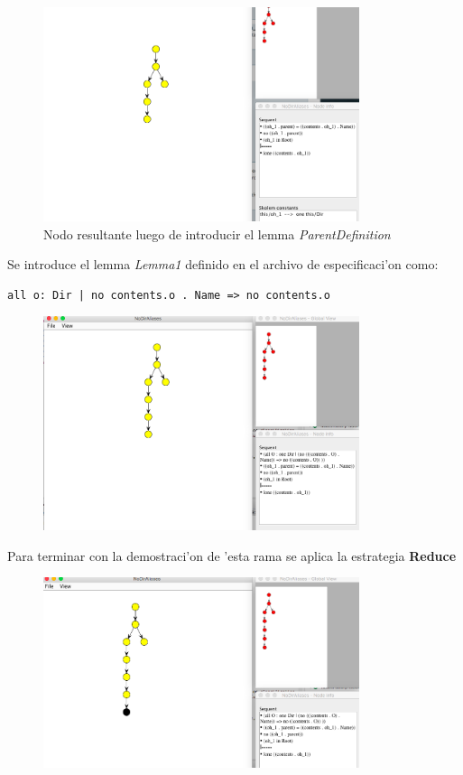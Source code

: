 \begin{figure}[H]
	\includegraphics[width=350px]{img/ejemplo/12.png}
	\centering
	\caption{Nodo resultante luego de introducir el lemma \textit{ParentDefinition}}
\end{figure}

Se introduce el lemma \textit{Lemma1} definido en el archivo de especificaci'on como:

\begin{verbatim}
all o: Dir | no contents.o . Name => no contents.o
\end{verbatim}

\begin{figure}[H]
	\includegraphics[width=350px]{img/ejemplo/13.png}
	\centering
	\caption{}
\end{figure}

Para terminar con la demostraci'on de 'esta rama se aplica la estrategia \textbf{Reduce}

\begin{figure}[H]
	\includegraphics[width=350px]{img/ejemplo/14.png}
	\centering
	\caption{}
\end{figure}

